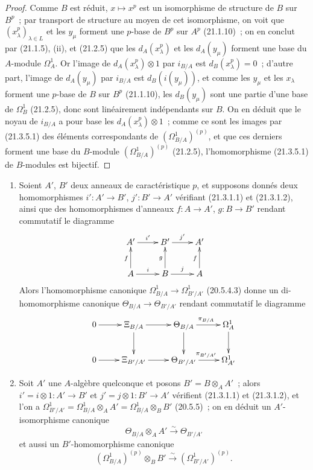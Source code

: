 \begin{proof}
Comme $B$ est réduit, $x\mapsto x^p$ est un isomorphisme de structure de
$B$ sur $B^p$~; par transport de structure au moyen de cet isomorphisme,
on voit que $(x_\lambda^p)_{\lambda\in L}$ et les $y_\mu$ forment une $p$-base
de $B^p$ sur $A^p$ (21.1.10)~; on en conclut par (21.1.5), (ii), et (21.2.5)
que les $d_A(x_\lambda^p)$ et les $d_A(y_\mu)$ forment une base du
$A$-module $\Omega^1_A$. Or l'image de $d_A(x_\lambda^p)\otimes1$ par
$i_{B/A}$ est $d_B(x_\lambda^p)=0$~; d'autre part, l'image de $d_A(y_\mu)$
par $i_{B/A}$ est $d_B(i(y_\mu))$, et comme les $y_\mu$ et les $x_\lambda$
forment une $p$-base de $B$ sur $B^p$ (21.1.10), les $d_B(y_\mu)$ sont une
partie d'une base de $\Omega^1_B$ (21.2.5), donc sont linéairement indépendants
sur $B$. On en déduit que le noyau de $i_{B/A}$ a pour base les
$d_A(x_\lambda^p)\otimes1$~; comme ce sont les images par (21.3.5.1) des
éléments correspondants de $(\Omega^1_{B/A})^{(p)}$, et que ces derniers
forment une base du $B$-module $(\Omega^1_{B/A})^{(p)}$ (21.2.5),
l'homomorphisme (21.3.5.1) de $B$-modules est bijectif.
\end{proof}

\begin{remarks}[21.3.6]
\label{0.21.3.6-fr}
\begin{enumerate}
  \item[(i)] Soient $A'$, $B'$ deux anneaux de caractéristique $p$, et
  supposons donnés deux homomorphismes $i':A'\to B'$, $j':B'\to A'$ vérifiant
  (21.3.1.1) et (21.3.1.2), ainsi que des homomorphismes d'anneaux
  $f:A\to A'$, $g:B\to B'$ rendant commutatif le diagramme
  \[
  \xymatrix{
  A'\ar[r]^{i'}&B'\ar[r]^{j'}&A'\\
  A\ar[u]^f\ar[r]^i&B\ar[u]^g\ar[r]^j&A\ar[u]^f
  }
  \]
  Alors l'homomorphisme canonique $\Omega^1_{B/A}\to\Omega^1_{B'/A'}$
  (20.5.4.3) donne un di-homomorphisme canonique
  $\Theta_{B/A}\to\Theta_{B'/A'}$ rendant commutatif le diagramme
  \[
  \xymatrix{
  0\ar[r]&\Xi_{B/A}\ar[r]\ar[d]&\Theta_{B/A}\ar[r]^{\pi_{B/A}}\ar[d]&\Omega^1_A\ar[d]\\
  0\ar[r]&\Xi_{B'/A'}\ar[r]&\Theta_{B'/A'}\ar[r]^{\pi_{B'/A'}}&\Omega^1_{A'}
  }
  \]
  \item[(ii)] Soit $A'$ une $A$-algèbre quelconque et posons
  $B'=B\otimes_A A'$~; alors $i'=i\otimes1:A'\to B'$ et
  $j'=j\otimes1:B'\to A'$ vérifient (21.3.1.1) et (21.3.1.2), et l'on a
  $\Omega^1_{B'/A'}=\Omega^1_{B/A}\otimes_A A'=\Omega^1_{B/A}\otimes_B B'$
  (20.5.5)~; on en déduit un $A'$-isomorphisme canonique
  \begin{equation}
  \tag{21.3.6.1}\label{0.21.3.6.1-fr}
  \Theta_{B/A}\otimes_A A'\xrightarrow{\sim}\Theta_{B'/A'}
  \end{equation}
  et aussi un $B'$-homomorphisme canonique
  \begin{equation}
  \tag{21.3.6.2}\label{0.21.3.6.2-fr}
  (\Omega^1_{B/A})^{(p)}\otimes_B B'\xrightarrow{\sim}
  (\Omega^1_{B'/A'})^{(p)}.
  \end{equation}
\end{enumerate}
\end{remarks}

